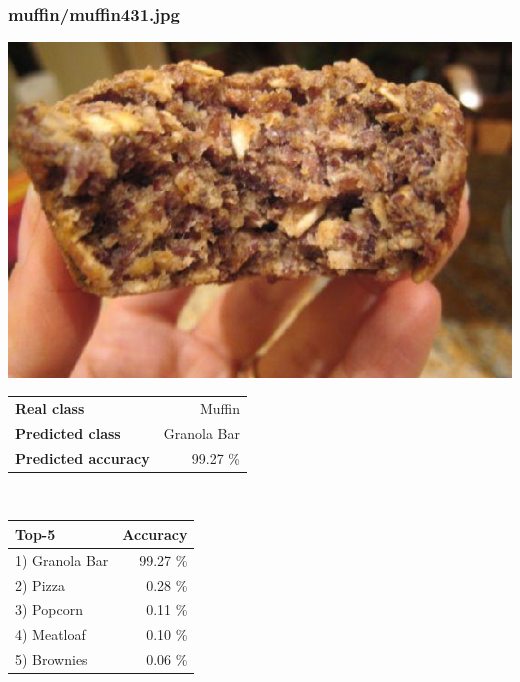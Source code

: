 \subsubsection{muffin/muffin431.jpg}

\begin{minipage}[t]{0.4\textwidth}
	\vspace{0pt}
	\includegraphics[width=\linewidth]{images/evaluation-images/muffin/muffin431.jpg}
\end{minipage}
\hfill
\begin{minipage}[t]{0.5\textwidth}
	\vspace{0pt}\raggedright
	\begin{tabularx}{\textwidth}{X r}
		\small \textbf{Real class} & \small Muffin\\
		\small \textbf{Predicted class} & \small Granola Bar\\
		\small \textbf{Predicted accuracy} & \small 99.27 \%
    \end{tabularx}\\
    
    \vspace{6pt}
	\begin{tabularx}{\textwidth}{X r}
        \small \textbf{Top-5} & \small \textbf{Accuracy} \\
        \hline
		\small 1) Granola Bar & \small 99.27 \%\\\small 2) Pizza & \small 0.28 \%\\\small 3) Popcorn & \small 0.11 \%\\\small 4) Meatloaf & \small 0.10 \%\\\small 5) Brownies & \small 0.06 \%
    \end{tabularx}
\end{minipage}
    
